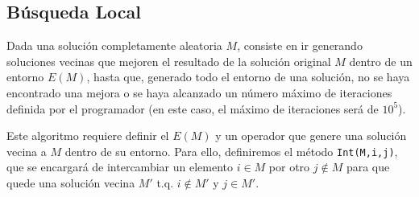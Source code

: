 \documentclass{article}
\begin{document}
    \begin{algorithmic}
                 
            \EndWhile
        \EndFunction
    \end{algorithmic}
    \pagebreak
    \begin{algorithmic}
         
             
            \EndFor
         
        \EndIf
        \EndFor
        \EndFunction
    \end{algorithmic}

    \subsection{Búsqueda Local}

    Dada una solución completamente aleatoria $M$, consiste en ir generando soluciones vecinas que mejoren
    el resultado de la solución original $M$ dentro de un entorno $E(M)$, hasta que, generado todo el entorno de
    una solución, no se haya encontrado una mejora o se haya alcanzado un número máximo de iteraciones definida por
    el programador (en este caso, el máximo de iteraciones será de $10^5$).
    
    Este algoritmo requiere definir el
    $E(M)$ y un operador que genere una solución vecina a $M$ dentro de su entorno.
    Para ello, definiremos el método \texttt{Int(M,i,j)}, que se encargará de intercambiar un elemento $i \in M$ por
    otro $j \notin M$ para que quede una solución vecina $M'$ t.q. $i \notin M'$ y $j \in M'$.
\end{document}

